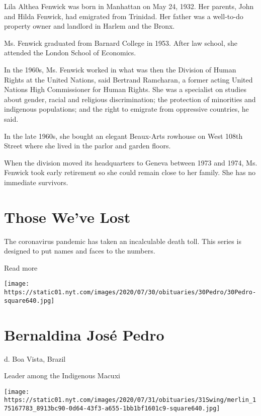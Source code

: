 Lila Althea Fenwick was born in Manhattan on May 24, 1932. Her parents,
John and Hilda Fenwick, had emigrated from Trinidad. Her father was a
well-to-do property owner and landlord in Harlem and the Bronx.

Ms. Fenwick graduated from Barnard College in 1953. After law school,
she attended the London School of Economics.

In the 1960s, Ms. Fenwick worked in what was then the Division of Human
Rights at the United Nations, said Bertrand Ramcharan, a former acting
United Nations High Commissioner for Human Rights. She was a specialist
on studies about gender, racial and religious discrimination; the
protection of minorities and indigenous populations; and the right to
emigrate from oppressive countries, he said.

In the late 1960s, she bought an elegant Beaux-Arts rowhouse on West
108th Street where she lived in the parlor and garden floors.

When the division moved its headquarters to Geneva between 1973 and
1974, Ms. Fenwick took early retirement so she could remain close to her
family. She has no immediate survivors.

\href{https://www.nytimes.com/interactive/2020/obituaries/people-died-coronavirus-obituaries.html?action=click\&pgtype=Article\&state=default\&region=BELOW_MAIN_CONTENT\&context=covid_obits_promo}{}

\hypertarget{those-weve-lost}{%
\section{Those We've Lost}\label{those-weve-lost}}

The coronavirus pandemic has taken an incalculable death toll. This
series is designed to put names and faces to the numbers.

Read more

\texttt{[image: https://static01.nyt.com/images/2020/07/30/obituaries/30Pedro/30Pedro-square640.jpg]}

\hypertarget{bernaldina-josuxe9-pedro}{%
\section{Bernaldina José Pedro}\label{bernaldina-josuxe9-pedro}}

d. Boa Vista, Brazil

Leader among the Indigenous Macuxi

\texttt{[image: https://static01.nyt.com/images/2020/07/31/obituaries/31Swing/merlin\_175167783\_8913bc90-0d64-43f3-a655-1bb1bf1601c9-square640.jpg]}

